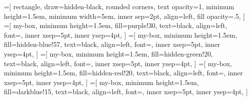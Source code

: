 \documentclass{llmxive}
\begin{document}
=[
rectangle,
draw=hidden-black,
rounded corners,
text opacity=1,
minimum height=1.5em,
minimum width=5em,
inner sep=2pt,
align=left,
fill opacity=.5,
]
=[
my-box,
minimum height=1.5em,
fill=purple!30,
text=black,
align=left,
font=\normalsize,
inner xsep=5pt,
inner ysep=4pt,
]
=[
my-box,
minimum height=1.5em,
fill=hidden-blue!57,
text=black,
align=left,
font=\normalsize,
inner xsep=5pt,
inner ysep=4pt,
]
=[
my-box,
minimum height=1.5em,
fill=hidden-green!20,
text=black,
align=left,
font=\normalsize,
inner xsep=5pt,
inner ysep=4pt,
]
=[
my-box,
minimum height=1.5em,
fill=hidden-red!20,
text=black,
align=left,
font=\normalsize,
inner xsep=5pt,
inner ysep=4pt,
]
=[
my-box,
minimum height=1.5em,
fill=darkblue!15,
text=black,
align=left,
font=\normalsize,
inner xsep=5pt,
inner ysep=4pt,
]
\end{document}
